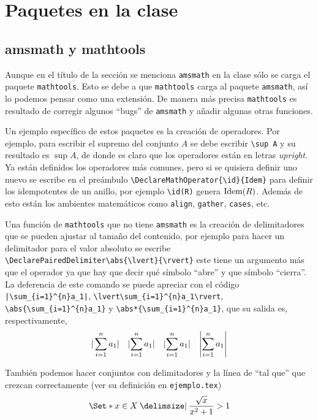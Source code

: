 
\chapter{Paquetes en la clase}

\section{amsmath y mathtools}
Aunque en el título de la sección se menciona \texttt{amsmath} en la clase
sólo se carga el paquete \texttt{mathtools}. Esto se debe a que
\texttt{mathtools} carga al paquete \texttt{amsmath}, así lo podemos pensar
como una extensión. De manera más precisa \texttt{mathtools} es resultado de
corregir algunos ``bugs'' de \texttt{amsmath} y añadir algunas otras funciones.

Un ejemplo específico de estos paquetes es la creación de operadores. Por
ejemplo, para escribir el supremo del conjunto \(A\) se debe escribir
\verb|\sup A| y su resultado es \(\sup A\), de donde es claro que los
operadores están en letras \textit{upright}. Ya están definidos los
operadores más comunes, pero si se quisiera definir uno nuevo se escribe en
el preámbulo \verb|\DeclareMathOperator{\id}{Idem}| para definir los
idempotentes de un anillo, por ejemplo \verb|\id(R)| genera \(\id(R)\).
Además de esto están los ambientes matemáticos como \texttt{align},
\texttt{gather}, \texttt{cases}, etc.

Una función de \texttt{mathtools} que no tiene \texttt{amsmath} es la creación
de delimitadores que se pueden ajustar al tamaño del contenido, por ejemplo
para hacer un delimitador para el valor absoluto se escribe
\verb|\DeclarePairedDelimiter\abs{\lvert}{\rvert}| este
tiene un argumento más que el operador ya que hay que decir qué símbolo
``abre'' y que símbolo ``cierra''. La deferencia de este comando se puede
apreciar con el código \verb!|\sum_{i=1}^{n}a_1|!,
\verb|\lvert\sum_{i=1}^{n}a_1\rvert|, \verb|\abs{\sum_{i=1}^{n}a_1}| y
\verb|\abs*{\sum_{i=1}^{n}a_1}|, que su salida es, respectivamente,
\[
  |\sum_{i=1}^{n}a_1| \quad \lvert\sum_{i=1}^{n}a_1\rvert \quad
  \abs{\sum_{i=1}^{n}a_1} \quad \abs*{\sum_{i=1}^{n}a_1}
\]

También podemos hacer conjuntos con delimitadores y la línea de ``tal que''
que crezcan correctamente (ver su definición en \texttt{ejemplo.tex})
\[
  \Set*{ x \in X \given \frac{\sqrt{x}}{x^2+1} > 1 }
\]


